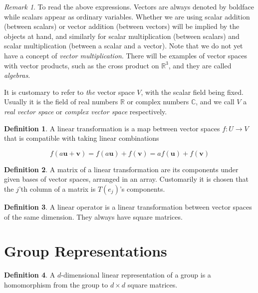 \documentclass[12pt]{article}
\theoremstyle{definition}
\newtheorem{definition}{Definition}[section]
\theoremstyle{remark}
\newtheorem*{remark}{Remark}
\theoremstyle{example}
\def\b#1{\textbf{#1}}
\begin{document}
\begin{remark}
	To read the above expressions. Vectors are always denoted by boldface while scalars appear as ordinary variables. Whether we are using scalar addition (between scalars) or vector addition (between vectors) will be implied by the objects at hand, and similarly for scalar multiplication (between scalars) and scalar multiplication (between a scalar and a vector). Note that we do not yet have a concept of \textit{vector multiplication}. There will be examples of vector spaces with vector products, such as the cross product on $\mathbb{R}^3$, and they are called \textit{algebras}.
	
	It is customary to refer to \textit{the} vector space $V$, with the scalar field being fixed. Usually it is the field of real numbers $\mathbb{R}$ or complex numbers $\mathbb{C}$, and we call $V$ a \textit{real vector space} or \textit{complex vector space} respectively.
\end{remark}

\begin{definition}
	A linear transformation is a map between vector spaces $f:U\to V$ that is compatible with taking linear combinations
	
	\begin{equation}
		f(a\b{u}+\b{v}) = f(a\b{u})+f(\b{v})=af(\b{u})+f(\b{v})
	\end{equation}
\end{definition}

\begin{definition}
	A matrix of a linear transformation are its components under given bases of vector spaces, arranged in an array. Customarily it is chosen that the $j$'th column of a matrix is $T(e_j)$'s components.
\end{definition}

\begin{definition}
	A linear operator is a linear transformation between vector spaces of the same dimension. They always have square matrices.
\end{definition}

\section{Group Representations}

\begin{definition}
	A $d$-dimensional linear representation of a group is a homomorphism from the group to $d\times d$ square matrices.
\end{definition}
\end{document}
